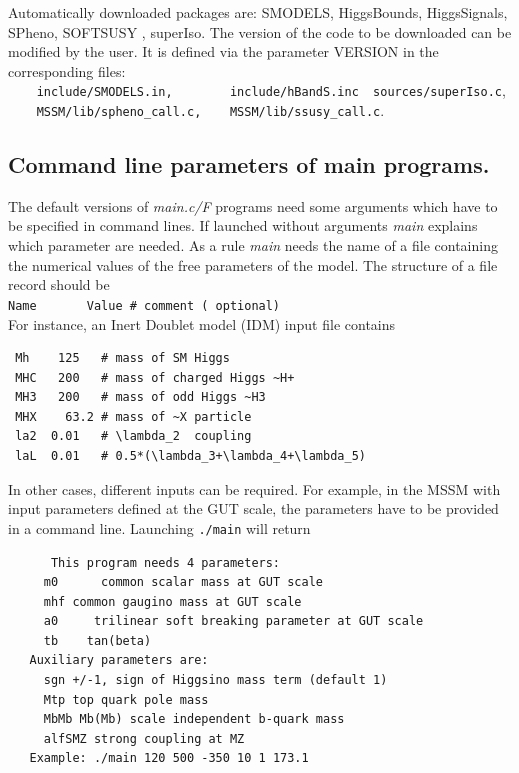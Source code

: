 \documentclass[12pt,a4paper]{article}
\begin{document}
Automatically downloaded packages are: SMODELS\cite{Kraml:2014sna}, HiggsBounds\cite{Bechtle:2013wla}, 
HiggsSignals\cite{Bechtle:2013xfa}, SPheno\cite{Porod:2011nf}, SOFTSUSY \cite{Allanach:2001kg},
superIso\cite{Ambrogi:2017neo}.
The version of the code to be downloaded   can be modified by the user. It is defined via the  parameter
VERSION   in the corresponding files:\\
 \verb|    include/SMODELS.in,        include/hBandS.inc  sources/superIso.c|,\\
 \verb|    MSSM/lib/spheno_call.c,    MSSM/lib/ssusy_call.c|.

\subsection{Command line parameters of main programs.}
\label{sec:command}
The default versions of {\it main.c/F}  programs need some arguments
which have to be specified in command lines. If launched without
arguments {\it main} explains which parameter are needed. 
As a rule  {\it main}  needs  the name of a file containing the
numerical values of the free parameters of the model. The structure of a file
record should be\\
\verb|Name       Value # comment ( optional)|\\

\noindent
For instance, an Inert Doublet model (IDM) input file contains
\begin{verbatim}
 Mh    125   # mass of SM Higgs 
 MHC   200   # mass of charged Higgs ~H+
 MH3   200   # mass of odd Higgs ~H3
 MHX    63.2 # mass of ~X particle
 la2  0.01   # \lambda_2  coupling
 laL  0.01   # 0.5*(\lambda_3+\lambda_4+\lambda_5)
\end{verbatim}


In other cases, different inputs can be required. For example, in the MSSM with input parameters defined at the GUT scale,
the parameters have to be provided in a command line. Launching \verb|./main| will return 
\begin{verbatim}
      This program needs 4 parameters:
     m0      common scalar mass at GUT scale
     mhf common gaugino mass at GUT scale
     a0     trilinear soft breaking parameter at GUT scale
     tb    tan(beta)
   Auxiliary parameters are:
     sgn +/-1, sign of Higgsino mass term (default 1)
     Mtp top quark pole mass
     MbMb Mb(Mb) scale independent b-quark mass
     alfSMZ strong coupling at MZ
   Example: ./main 120 500 -350 10 1 173.1
\end{verbatim}
\end{document}
